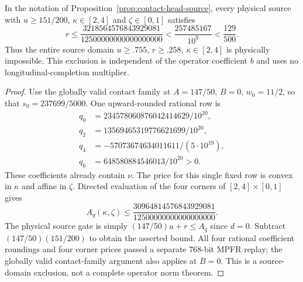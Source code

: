 \begin{corollary}
In the notation of Proposition~\ref{prop:contact-head-source}, every physical
source with $u\ge151/200$, $\kappa\in[2,4]$ and $\zeta\in[0,1]$ satisfies
\[
 r\le\frac{3218564576843929081}{12500000000000000000}
 <\frac{257485167}{10^9}<\frac{129}{500}.
\]
Thus the entire source domain $u\ge.755$, $r\ge.258$, $\kappa\in[2,4]$
is physically impossible.  This exclusion is independent of the operator
coefficient $b$ and uses no longitudinal-completion multiplier.
\end{corollary}
\begin{proof}
Use the globally valid contact family at $A=147/50$, $B=0$, $w_0=11/2$,
so that $s_0=237699/5000$.  One upward-rounded rational row is
\[
\begin{split}
q_0&=234578060876042414629/10^{20},\\
q_2&=13569465319776621699/10^{20},\\
q_4&=-57073674634011611/(5\cdot10^{19}),\\
q_6&=648580884546013/10^{20}>0.
\end{split}
\]
These coefficients already contain $\nu$.  The price for this single fixed
row is convex in $\kappa$ and affine in $\zeta$.  Directed evaluation of the
four corners of $[2,4]\times[0,1]$ gives
\[
 A_q(\kappa,\zeta)
 \le\frac{30964814576843929081}{12500000000000000000}.
\]
The physical source gate is simply $(147/50)u+r\le A_q$ since $d=0$.
Subtract $(147/50)(151/200)$ to obtain the asserted bound.
All four rational coefficient roundings and four corner prices passed a
separate 768-bit MPFR replay; the globally valid contact-family argument
also applies at $B=0$.
This is a source-domain exclusion, not a complete operator norm theorem.
\end{proof}
